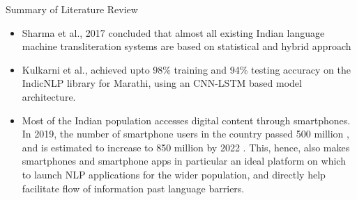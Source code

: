 \documentclass{beamer}
\begin{document}
\begin{frame}[allowframebreaks]{Summary of Literature Review}
\begin{itemize}
		\item  Sharma et al., 2017 concluded that almost all  existing Indian language machine transliteration systems are based on statistical and hybrid approach \cite{sharma2017machine}
		\item Kulkarni et al., achieved upto 98\%  training and 94\% testing accuracy on the IndicNLP library for Marathi, using an CNN-LSTM based model architecture. \cite{kulkarni2021experimental}
		\item Most of the Indian population accesses digital content through smartphones. In 2019, the number of smartphone users in the country passed 500 million \cite{news18_2020}, and is estimated to increase to 850 million by 2022 \cite{www.ettelecom.com_2020}. This, hence, also makes smartphones and smartphone apps in particular an ideal platform on which to launch NLP applications for the wider population, and directly help facilitate flow of information past language barriers.
\end{itemize} 
\end{frame}
\end{document}
